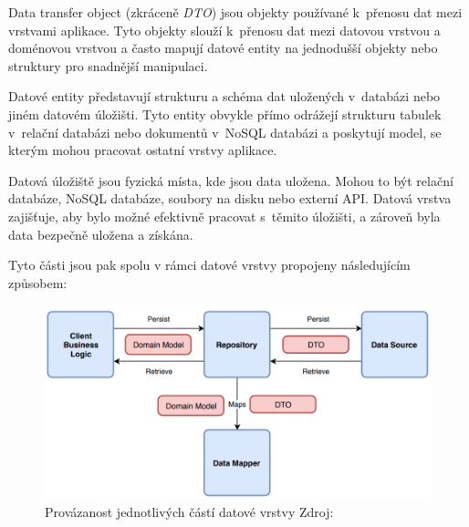 Data transfer object (zkráceně \textit{DTO}) jsou objekty používané k~přenosu dat mezi vrstvami aplikace. Tyto objekty slouží k~přenosu dat mezi datovou vrstvou a doménovou 
vrstvou a často mapují datové entity na jednodušší objekty nebo struktury pro snadnější manipulaci. \cite{DTO}

Datové entity představují strukturu a schéma dat uložených v~databázi nebo jiném datovém úložišti. Tyto entity obvykle přímo odrážejí
strukturu tabulek v~relační databázi nebo dokumentů v~NoSQL databázi a poskytují model, se kterým mohou pracovat ostatní vrstvy aplikace.

Datová úložiště jsou fyzická místa, kde jsou data uložena. Mohou to být relační databáze, NoSQL databáze, soubory na disku nebo externí API. 
Datová vrstva zajišťuje, aby bylo možné efektivně pracovat s~těmito úložišti, a zároveň byla data bezpečně uložena a získána.

\bigskip

Tyto části jsou pak spolu v rámci datové vrstvy propojeny následujícím způsobem:

\begin{figure}[H]
  \centering
  \includegraphics[width=.8\textwidth]{arch_diagram.png}
  \caption{Provázanost jednotlivých částí datové vrstvy Zdroj: \cite{imgDataDiagram}}
  \label{fig:arch_diagram}
\end{figure}

\bigskip







